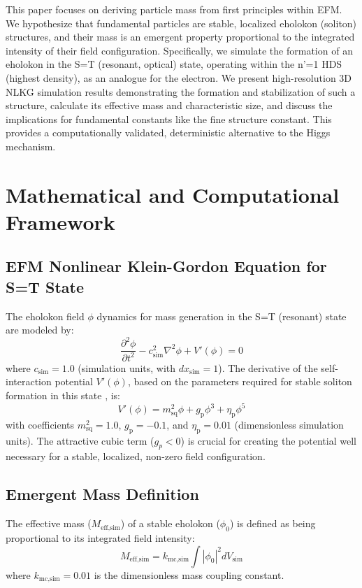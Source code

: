 \documentclass[11pt]{article}
\begin{document}
This paper focuses on deriving particle mass from first principles within EFM. We hypothesize that fundamental particles are stable, localized eholokon (soliton) structures, and their mass is an emergent property proportional to the integrated intensity of their field configuration. Specifically, we simulate the formation of an eholokon in the S=T (resonant, optical) state, operating within the n'=1 HDS (highest density), as an analogue for the electron. We present high-resolution 3D NLKG simulation results demonstrating the formation and stabilization of such a structure, calculate its effective mass and characteristic size, and discuss the implications for fundamental constants like the fine structure constant. This provides a computationally validated, deterministic alternative to the Higgs mechanism.

\section{Mathematical and Computational Framework}

\subsection{EFM Nonlinear Klein-Gordon Equation for S=T State}
The eholokon field \(\phi\) dynamics for mass generation in the S=T (resonant) state are modeled by:
\begin{equation}
\frac{\partial^2 \phi}{\partial t^2} - c_{\text{sim}}^2 \nabla^2 \phi + V'(\phi) = 0
\label{eq:nlkg_massgen}
\end{equation}
where \(c_{\text{sim}}=1.0\) (simulation units, with \(dx_{\text{sim}}=1\)). The derivative of the self-interaction potential \(V'(\phi)\), based on the parameters required for stable soliton formation in this state \citep{emvula2025dimensionless_params}, is:
\begin{equation}
V'(\phi) = m_{\text{sq}}^2 \phi + g_{\text{p}} \phi^3 + \eta_{\text{p}} \phi^5
\label{eq:potential_derivative}
\end{equation}
with coefficients \(m_{\text{sq}}^2 = 1.0\), \(g_{\text{p}} = -0.1\), and \(\eta_{\text{p}} = 0.01\) (dimensionless simulation units). The attractive cubic term ($g_p < 0$) is crucial for creating the potential well necessary for a stable, localized, non-zero field configuration.

\subsection{Emergent Mass Definition}
The effective mass (\(M_{\text{eff,sim}}\)) of a stable eholokon (\(\phi_0\)) is defined as being proportional to its integrated field intensity:
\begin{equation}
M_{\text{eff,sim}} = k_{\text{mc,sim}} \int |\phi_0|^2 dV_{\text{sim}}
\label{eq:mass_definition}
\end{equation}
where \(k_{\text{mc,sim}} = 0.01\) is the dimensionless mass coupling constant.
\end{document}
